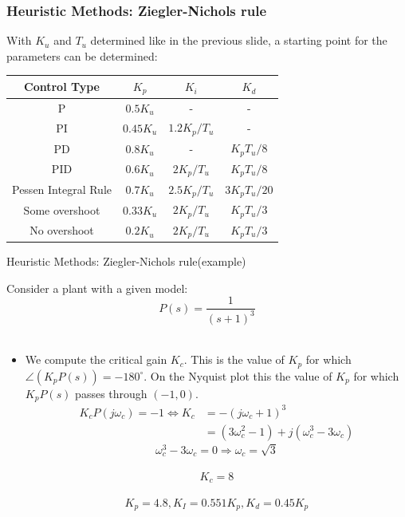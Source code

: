 \begin{frame}
	\frametitle{Heuristic Methods: Ziegler-Nichols rule}
	With $K_u$ and $T_u$ determined like in the previous slide, a starting point for the parameters can be determined:
	\vspace{1em}
	
	\begin{tabular}{c | c | c | c}
		Control Type	&	$K_p$		&	$K_i$			&	$K_d$ 	\\
		\hline
		P				&	$0.5K_u$	&	-				&	-		\\
		PI				&	$0.45K_u$	&	$1.2K_p/T_u$		&	-		\\
		PD				&	$0.8K_u$	&	-				&	$K_pT_u/8$ \\
		PID				&	$0.6K_u$	&	$2K_p/T_u$		&	$K_pT_u/8$ \\
		Pessen Integral Rule & $0.7K_u$ &	$2.5K_p/T_u$	&	$3K_pT_u/20$\\
		Some overshoot	&	$0.33K_u$	&	$2K_p/T_u$		&	$K_pT_u/3$	\\
		No overshoot	&	$0.2K_u$	&	$2K_p/T_u$		&	$K_pT_u/3$	\\
	\end{tabular}
\end{frame}
\begin{frame}{Heuristic Methods: Ziegler-Nichols rule(example)}
	\small{
	\begin{example}
		Consider a plant with a given model:\\
		\vspace{-0.5em}
			$$ P(s) = \frac{1}{(s+1)^3} $$\\
			\vspace{-0.7em}
			\begin{itemize}
				\item We compute the critical gain $K_c$. This is the value of $K_p$ for which $\angle (K_p P(s)) = - 180^\circ$. On the Nyquist plot this the value of $K_p$ for which $K_p P(s)$ passes through $(-1,0)$.\\
				\vspace{-1.5em}
				\begin{align*}
					K_cP(j\omega_c) = -1 \Leftrightarrow K_c &= -(j\omega_c + 1)^3 \\
					& = (3\omega_c^2-1)+j(\omega_c^3 - 3\omega_c)
				\end{align*}
				\vspace{-1.5em}
					$$ \omega_c^3-3\omega_c = 0 \Rightarrow \omega_c = \sqrt{3}$$\\
					\vspace{-1.5em}
					$$K_c = 8 $$\\
					\vspace{-1.5em}
					$$K_p = 4.8, K_I = 0.551  K_p, K_d =  0.45 K_p$$
			\end{itemize}
	\end{example}}
\end{frame}
